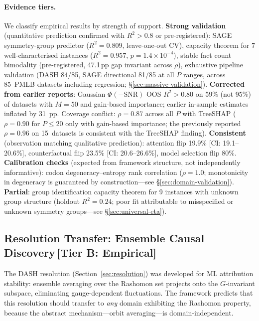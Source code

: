 \documentclass[11pt,a4paper]{article}
\begin{document}
\paragraph{Evidence tiers.}
We classify empirical results by strength of support.
\textbf{Strong validation} (quantitative prediction confirmed with $R^2 > 0.8$ or pre-registered): SAGE symmetry-group predictor ($R^2 = 0.809$, leave-one-out CV), capacity theorem for 7 well-characterised instances ($R^2 = 0.957$, $p = 1.4 \times 10^{-4}$), stable fact count bimodality (pre-registered, 47.1\,pp gap invariant across $\rho$), exhaustive pipeline validation (DASH 84/85, SAGE directional 81/85 at all $P$ ranges, across 85~PMLB datasets including regression; \S\ref{sec:massive-validation}).
\textbf{Corrected from earlier reports}: Gaussian $\Phi(-\text{SNR})$ OOS $R^2 > 0.80$ on 59\% (not 95\%) of datasets with $M = 50$ and gain-based importance; earlier in-sample estimates inflated by 31~pp.  Coverage conflict: $\rho = 0.87$ across all $P$ with TreeSHAP ($\rho = 0.90$ for $P \leq 20$ only with gain-based importance; the previously reported $\rho = 0.96$ on 15~datasets is consistent with the TreeSHAP finding).
\textbf{Consistent} (observation matching qualitative prediction): attention flip 19.9\% [CI: 19.1--20.6\%], counterfactual flip 23.5\% [CI: 20.6--26.6\%], model selection flip 80\%.
\textbf{Calibration checks} (expected from framework structure, not independently informative): codon degeneracy--entropy rank correlation ($\rho = 1.0$; monotonicity in degeneracy is guaranteed by construction---see \S\ref{sec:domain-validation}).
\textbf{Partial}: group identification capacity theorem for 9 instances with unknown group structure (holdout $R^2 = 0.24$; poor fit attributable to misspecified or unknown symmetry groups---see \S\ref{sec:universal-eta}).

\subsection{Resolution Transfer: Ensemble Causal Discovery\,\textnormal{\normalsize[Tier B: Empirical]}}
\label{sec:ensemble-causal}

The DASH resolution (Section~\ref{sec:resolution}) was developed for ML
attribution stability: ensemble averaging over the Rashomon set projects onto
the $G$-invariant subspace, eliminating gauge-dependent fluctuations.  The
framework predicts that this resolution should transfer to \emph{any} domain
exhibiting the Rashomon property, because the abstract mechanism---orbit
averaging---is domain-independent.
\end{document}
